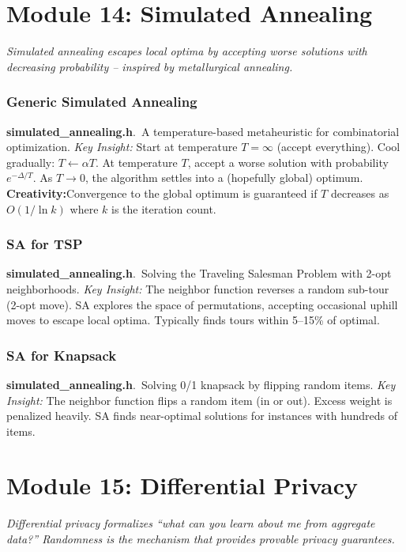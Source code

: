 \documentclass[11pt,a4paper]{article}
\newcommand{\algo}[2]{\textbf{#1}.\ #2}
\newcommand{\insight}{\textit{Key Insight: }}
\newcommand{\creative}{\textcolor{orange!80!black}{\textbf{Creativity:}}}
\begin{document}
\section{Module 14: Simulated Annealing}
\label{sec:sa}

\textit{Simulated annealing escapes local optima by accepting worse solutions with decreasing probability -- inspired by metallurgical annealing.}

\subsubsection{Generic Simulated Annealing}
\algo{simulated\_annealing.h}{A temperature-based metaheuristic for combinatorial optimization.}
\insight Start at temperature \(T = \infty\) (accept everything). Cool gradually: \(T \leftarrow \alpha T\). At temperature \(T\), accept a worse solution with probability \(e^{-\Delta/T}\). As \(T \to 0\), the algorithm settles into a (hopefully global) optimum.
\creative Convergence to the global optimum is guaranteed if \(T\) decreases as \(O(1/\ln k)\) where \(k\) is the iteration count.

\subsubsection{SA for TSP}
\algo{simulated\_annealing.h}{Solving the Traveling Salesman Problem with 2-opt neighborhoods.}
\insight The neighbor function reverses a random sub-tour (2-opt move). SA explores the space of permutations, accepting occasional uphill moves to escape local optima. Typically finds tours within 5--15\% of optimal.

\subsubsection{SA for Knapsack}
\algo{simulated\_annealing.h}{Solving 0/1 knapsack by flipping random items.}
\insight The neighbor function flips a random item (in or out). Excess weight is penalized heavily. SA finds near-optimal solutions for instances with hundreds of items.

\section{Module 15: Differential Privacy}
\label{sec:dp}

\textit{Differential privacy formalizes ``what can you learn about me from aggregate data?'' Randomness is the mechanism that provides provable privacy guarantees.}
\end{document}
